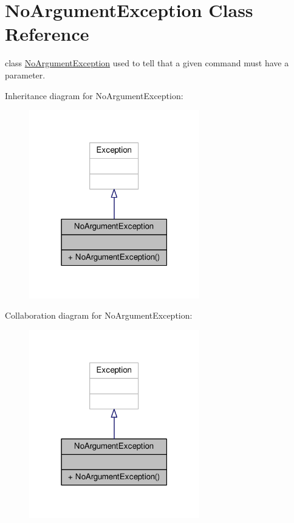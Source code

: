\hypertarget{classNoArgumentException}{\section{No\-Argument\-Exception Class Reference}
\label{classNoArgumentException}
}


class \hyperlink{classNoArgumentException}{No\-Argument\-Exception} used to tell that a given command must have a parameter.  




Inheritance diagram for No\-Argument\-Exception\-:
\nopagebreak
\begin{figure}[H]
\begin{center}
\leavevmode
\includegraphics[width=210pt]{classNoArgumentException__inherit__graph}
\end{center}
\end{figure}


Collaboration diagram for No\-Argument\-Exception\-:
\nopagebreak
\begin{figure}[H]
\begin{center}
\leavevmode
\includegraphics[width=210pt]{classNoArgumentException__coll__graph}
\end{center}
\end{figure}
